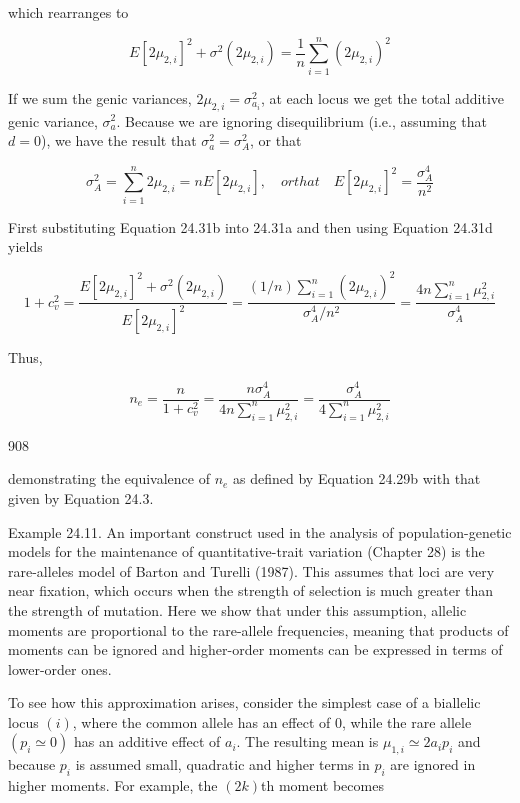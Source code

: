\documentclass{article}
\begin{document}
which rearranges to

\begin{equation}
E[2\mu_{2,i}]^{2}+\sigma^{2}(2\mu_{2,i})=\frac{1}{n}\sum_{i=1}^{n}(2\mu_{2,i})^{2}
\tag{24.31c}
\label{eq:24_31c}
\end{equation}

If we sum the genic variances,  $ 2\mu_{2,i} = \sigma_{a_i}^2 $, at each locus we get the total additive genic variance,  $ \sigma_a^2 $. Because we are ignoring disequilibrium (i.e., assuming that  $ d = 0 $), we have the result that  $ \sigma_a^2 = \sigma_A^2 $, or that

\begin{equation}
\sigma_{A}^{2}=\sum_{i=1}^{n}2\mu_{2,i}=n E[2\mu_{2,i}],\quad or that\quad E[2\mu_{2,i}]^{2}=\frac{\sigma_{A}^{4}}{n^{2}}
\tag{24.31d}
\label{eq:24_31d}
\end{equation}

First substituting Equation 24.31b into 24.31a and then using Equation 24.31d yields

\begin{equation}
1+c_{v}^{2}=\frac{E[2\mu_{2,i}]^{2}+\sigma^{2}(2\mu_{2,i})}{E[2\mu_{2,i}]^{2}}=\frac{(1/n)\sum_{i=1}^{n}(2\mu_{2,i})^{2}}{\sigma_{A}^{4}/n^{2}}=\frac{4n\sum_{i=1}^{n}\mu_{2,i}^{2}}{\sigma_{A}^{4}}
\end{equation}

Thus,

\begin{equation}
n_{e}=\frac{n}{1+c_{v}^{2}}=\frac{n\sigma_{A}^{4}}{4n\sum_{i=1}^{n}\mu_{2,i}^{2}}=\frac{\sigma_{A}^{4}}{4\sum_{i=1}^{n}\mu_{2,i}^{2}}
\end{equation}

908

demonstrating the equivalence of  $ n_{e} $ as defined by Equation 24.29b with that given by Equation 24.3.

Example 24.11. An important construct used in the analysis of population-genetic models for the maintenance of quantitative-trait variation (Chapter 28) is the rare-alleles model of Barton and Turelli (1987). This assumes that loci are very near fixation, which occurs when the strength of selection is much greater than the strength of mutation. Here we show that under this assumption, allelic moments are proportional to the rare-allele frequencies, meaning that products of moments can be ignored and higher-order moments can be expressed in terms of lower-order ones.

To see how this approximation arises, consider the simplest case of a biallelic locus  $ (i) $, where the common allele has an effect of 0, while the rare allele  $ (p_i \simeq 0) $ has an additive effect of  $ a_i $. The resulting mean is  $ \mu_{1,i} \simeq 2a_i p_i $ and because  $ p_i $ is assumed small, quadratic and higher terms in  $ p_i $ are ignored in higher moments. For example, the  $ (2k) $th moment becomes
\end{document}
